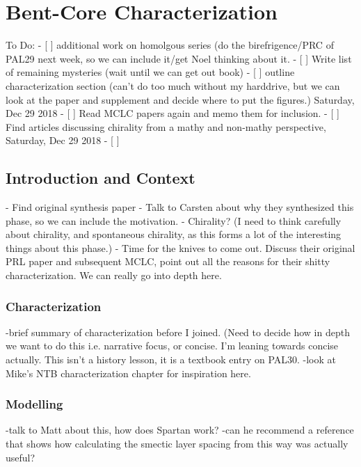 \chapter{Bent-Core Characterization}
To Do:
- [ ] additional work on homolgous series (do the birefrigence/PRC of PAL29 next
week, so we can include it/get Noel thinking about it.
- [ ] Write list of remaining mysteries (wait until we can get out book)
- [ ] outline characterization section (can't do too much without my harddrive,
but we can look at the paper and supplement and decide where to put the
figures.) Saturday, Dec 29 2018
- [ ]  Read MCLC papers again and memo them for inclusion.
- [ ] Find articles discussing chirality from a mathy and non-mathy perspective,
Saturday, Dec 29 2018
- [ ] 

\section{Introduction and Context}
- Find original synthesis paper
- Talk to Carsten about why they synthesized this phase, so we can include the
motivation.
- Chirality? (I need to think carefully about chirality, and spontaneous
chirality, as this forms a lot of the interesting things about this phase.)
- Time for the knives to come out. Discuss their original PRL paper and
subsequent MCLC, point out all the reasons for their shitty characterization. We
can really go into depth here.

\subsection{Characterization}
-brief summary of characterization before I joined. (Need to decide how in depth
we want to do this i.e. narrative focus, or concise. I'm leaning towards concise
actually. This isn't a history lesson, it is a textbook entry on PAL30. 
-look at Mike's NTB characterization chapter for inspiration here.
\subsection{Modelling}
-talk to Matt about this, how does Spartan work?
-can he recommend a reference that shows how calculating the smectic layer
spacing from this way was actually useful?
